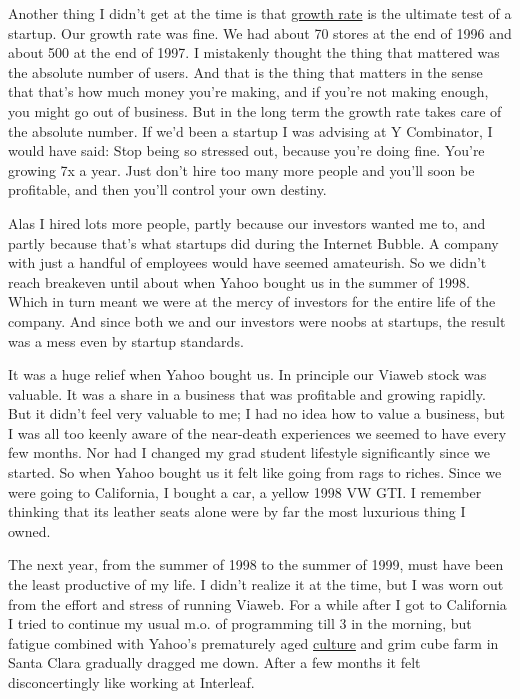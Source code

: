 Another thing I didn't get at the time is that \href{growth.html}{growth
rate} is the ultimate test of a startup. Our growth rate was fine. We
had about 70 stores at the end of 1996 and about 500 at the end of 1997.
I mistakenly thought the thing that mattered was the absolute number of
users. And that is the thing that matters in the sense that that's how
much money you're making, and if you're not making enough, you might go
out of business. But in the long term the growth rate takes care of the
absolute number. If we'd been a startup I was advising at Y Combinator,
I would have said: Stop being so stressed out, because you're doing
fine. You're growing 7x a year. Just don't hire too many more people and
you'll soon be profitable, and then you'll control your own destiny.

Alas I hired lots more people, partly because our investors wanted me
to, and partly because that's what startups did during the Internet
Bubble. A company with just a handful of employees would have seemed
amateurish. So we didn't reach breakeven until about when Yahoo bought
us in the summer of 1998. Which in turn meant we were at the mercy of
investors for the entire life of the company. And since both we and our
investors were noobs at startups, the result was a mess even by startup
standards.

It was a huge relief when Yahoo bought us. In principle our Viaweb stock
was valuable. It was a share in a business that was profitable and
growing rapidly. But it didn't feel very valuable to me; I had no idea
how to value a business, but I was all too keenly aware of the
near-death experiences we seemed to have every few months. Nor had I
changed my grad student lifestyle significantly since we started. So
when Yahoo bought us it felt like going from rags to riches. Since we
were going to California, I bought a car, a yellow 1998 VW GTI. I
remember thinking that its leather seats alone were by far the most
luxurious thing I owned.

The next year, from the summer of 1998 to the summer of 1999, must have
been the least productive of my life. I didn't realize it at the time,
but I was worn out from the effort and stress of running Viaweb. For a
while after I got to California I tried to continue my usual m.o. of
programming till 3 in the morning, but fatigue combined with Yahoo's
prematurely aged \href{yahoo.html}{culture} and grim cube farm in Santa
Clara gradually dragged me down. After a few months it felt
disconcertingly like working at Interleaf.

